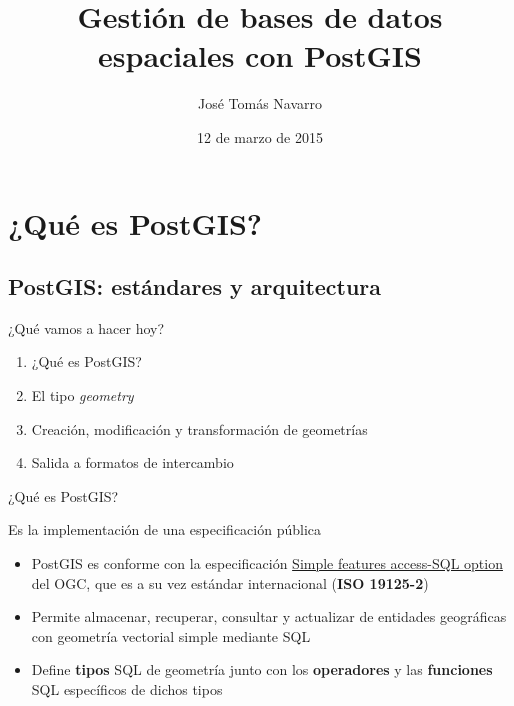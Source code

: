 \documentclass{classes/beamer_GeomaticaUA}
\author{José Tomás Navarro}
\title{Gestión de bases de datos espaciales con PostGIS}
\institute[GeomaticaLab]{Instituto Interuniversitario de Geografía\\Laboratorio de Geomática}
\date{12 de marzo de 2015}
\begin{document}
\begin{frame}
\titlepage
\end{frame}

\section[Introducción]{¿Qué es PostGIS?}
\subsection{PostGIS: estándares y arquitectura}
\begin{frame}{¿Qué vamos a hacer hoy?}

\begin{enumerate}
\item ¿Qué es PostGIS?
\item El tipo \textit{geometry}
\item Creación, modificación y transformación de geometrías
\item Salida a formatos de intercambio
\end{enumerate}
\end{frame}

\begin{frame}{¿Qué es PostGIS?}
\begin{block}{Es la implementación de una especificación pública}
\begin{itemize}
\item PostGIS es conforme con la especificación \href{http://www.opengeospatial.org/standards/sfs}{Simple features access-SQL option} del OGC, que es a su vez estándar internacional (\textbf{ISO 19125-2})
\item Permite almacenar, recuperar, consultar y actualizar de entidades geográficas con geometría vectorial simple mediante SQL
\item Define \textbf{tipos} SQL de geometría junto con los \textbf{operadores} y las \textbf{funciones} SQL específicos de dichos tipos
\end{itemize}
\end{block}
\end{frame}
\end{document}
